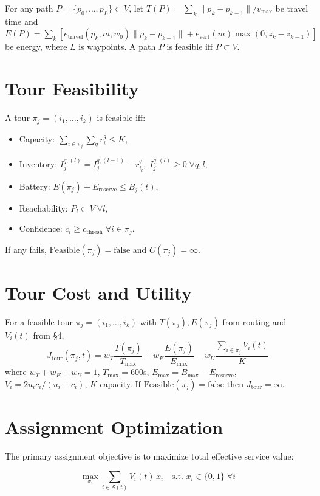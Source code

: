 \documentclass[conference]{IEEEtran}
\begin{document}
For any path $P=\{p_0,\dots,p_L\}\subset V$, let $T(P)=\sum_{k}\|p_k-p_{k-1}\|/v_{\max}$ be travel time and $E(P)=\sum_{k}[e_{\text{travel}}(p_k,m,w_0)\|p_k-p_{k-1}\|+e_{\text{vert}}(m)\max(0,z_k-z_{k-1})]$ be energy, where $L$ is waypoints. A path $P$ is feasible iff $P\subset V$.

\section{Tour Feasibility}

A tour $\pi_j=(i_1,\dots,i_k)$ is feasible iff:
\begin{itemize}
\item Capacity: $\sum_{i\in\pi_j}\sum_q r_i^q \leq K$,
\item Inventory: $I_j^{q,(l)}=I_j^{q,(l-1)}-r_{i_l}^q,\; I_j^{q,(l)}\geq0\;\forall q,l$,
\item Battery: $E(\pi_j)+E_{\text{reserve}}\leq B_j(t)$,
\item Reachability: $P_l\subset V\;\forall l$,
\item Confidence: $c_i\geq c_{\text{thresh}}\;\forall i\in\pi_j$.
\end{itemize}
If any fails, $\text{Feasible}(\pi_j)=\text{false}$ and $C(\pi_j)=\infty$.

\section{Tour Cost and Utility}

For a feasible tour $\pi_j=(i_1,\dots,i_k)$ with $T(\pi_j),E(\pi_j)$ from routing and $V_i(t)$ from \S4,
\begin{equation}
J_{\text{tour}}(\pi_j,t)=w_T\frac{T(\pi_j)}{T_{\max}}+w_E\frac{E(\pi_j)}{E_{\max}}-w_U\frac{\sum_{i\in\pi_j}V_i(t)}{K}
\end{equation}
where $w_T+w_E+w_U=1$, $T_{\max}=600$s, $E_{\max}=B_{\max}-E_{\text{reserve}}$, $V_i=2u_ic_i/(u_i+c_i)$, $K$ capacity. If $\text{Feasible}(\pi_j)=\text{false}$ then $J_{\text{tour}}=\infty$.

\section{Assignment Optimization}

The primary assignment objective is to maximize total effective service value:

\begin{equation}
\max_{x_i} \sum_{i\in\mathcal{S}(t)} V_i(t)\,x_i \quad \text{s.t. } x_i\in\{0,1\}\;\forall i
\end{equation}
\end{document}
